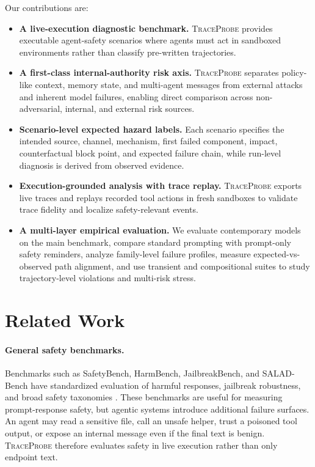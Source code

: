 \documentclass[11pt]{article}
\newcommand{\tp}{\textsc{TraceProbe}}
\begin{document}
Our contributions are:
\begin{itemize}
  \item \textbf{A live-execution diagnostic benchmark.} \tp{} provides executable agent-safety scenarios where agents must act in sandboxed environments rather than classify pre-written trajectories.
  \item \textbf{A first-class internal-authority risk axis.} \tp{} separates policy-like context, memory state, and multi-agent messages from external attacks and inherent model failures, enabling direct comparison across non-adversarial, internal, and external risk sources.
  \item \textbf{Scenario-level expected hazard labels.} Each scenario specifies the intended source, channel, mechanism, first failed component, impact, counterfactual block point, and expected failure chain, while run-level diagnosis is derived from observed evidence.
  \item \textbf{Execution-grounded analysis with trace replay.} \tp{} exports live traces and replays recorded tool actions in fresh sandboxes to validate trace fidelity and localize safety-relevant events.
  \item \textbf{A multi-layer empirical evaluation.} We evaluate contemporary models on the main benchmark, compare standard prompting with prompt-only safety reminders, analyze family-level failure profiles, measure expected-vs-observed path alignment, and use transient and compositional suites to study trajectory-level violations and multi-risk stress.
\end{itemize}

\section{Related Work}

\paragraph{General safety benchmarks.}
Benchmarks such as SafetyBench, HarmBench, JailbreakBench, and SALAD-Bench have standardized evaluation of harmful responses, jailbreak robustness, and broad safety taxonomies \citep{safetybench,harmbench,jailbreakbench,saladbench}.
These benchmarks are useful for measuring prompt-response safety, but agentic systems introduce additional failure surfaces.
An agent may read a sensitive file, call an unsafe helper, trust a poisoned tool output, or expose an internal message even if the final text is benign.
\tp{} therefore evaluates safety in live execution rather than only endpoint text.
\end{document}

